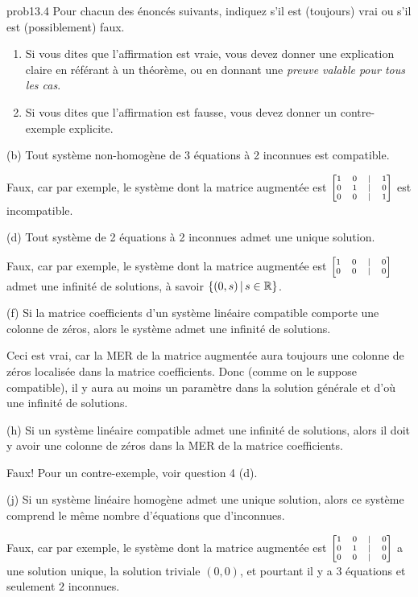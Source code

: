 \bigskip
\begin{sol}{prob13.4}  Pour chacun des énoncés suivants, indiquez s'il est (toujours) vrai
ou s'il est (possiblement) faux.    
   \smallskip    
\begin{enumerate}[$\bullet$]
\item Si vous dites que l'affirmation est vraie, vous devez donner une explication claire en r\'ef\'erant \`a un théorème, ou en donnant une {\it preuve valable pour tous les cas}.
\item Si vous dites que l'affirmation est fausse, vous devez donner un contre-exemple explicite.  
\end{enumerate}
\medskip

(b) Tout système non-homogène de 3 équations à 2 inconnues est compatible.


\soln Faux, car par exemple, le syst\`eme dont la matrice augment\'ee est 
$\scriptsize\bmatrix  
1 & 0 &|& 1 \\
0 & 1 &|& 0\\
0 & 0 &|& 1 \endbmatrix$ est incompatible.
\medskip
 

(d) Tout système de 2 équations à 2 inconnues admet une unique solution.

\soln  Faux, car par exemple, le syst\`eme dont la matrice augment\'ee est 
$\scriptsize\bmatrix  
1 & 0 &|& 0 \\
0 & 0 &|& 0\\
 \endbmatrix$ admet une infinit\'e de solutions, \`a savoir $ \{(0,s) \,|\, s\in \mathbb{R}\}$.
\medskip

(f) Si la matrice coefficients d'un système linéaire compatible comporte une colonne de zéros, alors le système admet une infinité de solutions.

\soln Ceci est vrai, car la MER de la matrice augmentée aura toujours une colonne de zéros localis\'ee dans la matrice coefficients. Donc (comme on le suppose compatible), il y aura au moins un paramètre dans la solution générale et d'o\`u une infinit\'e de solutions.
\medskip

(h) Si un système linéaire compatible admet une infinité de solutions, alors il doit y avoir une colonne de zéros dans la MER de la matrice coefficients.

\soln Faux! Pour un contre-exemple, voir question 4 (d).
\medskip
 

(j) Si un système linéaire homogène admet une unique solution, alors ce système comprend le même nombre d'équations que d'inconnues.

\soln Faux, car par exemple, le syst\`eme dont la matrice augment\'ee est  
$\scriptsize\bmatrix  
1 & 0 &|& 0 \\
0 & 1 &|& 0\\
0 & 0 &|& 0 \endbmatrix$ a une solution unique, la solution triviale $(0,0)$, et pourtant il y a $3$ équations et seulement $2$ inconnues.
\medskip
 

\end{sol}

